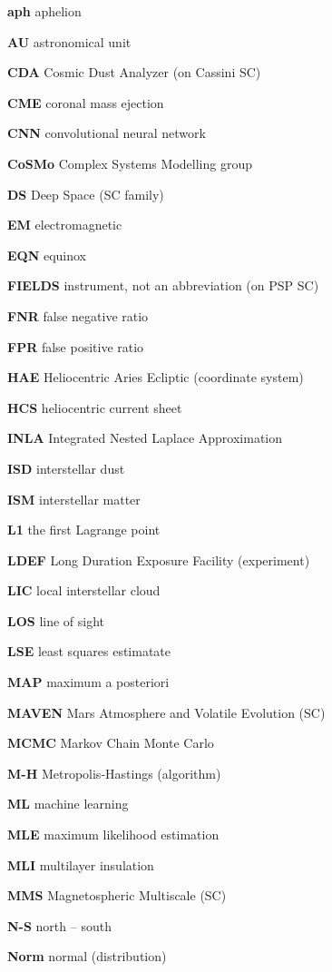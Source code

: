\noindent

\textbf{aph} aphelion

\textbf{AU} astronomical unit

\textbf{CDA} Cosmic Dust Analyzer (on Cassini SC)

\textbf{CME} coronal mass ejection

\textbf{CNN} convolutional neural network

\textbf{CoSMo} Complex Systems Modelling group

\textbf{DS} Deep Space (SC family)

\textbf{EM} electromagnetic

\textbf{EQN} equinox

\textbf{FIELDS} instrument, not an abbreviation (on PSP SC)

\textbf{FNR} false negative ratio

\textbf{FPR} false positive ratio

\textbf{HAE} Heliocentric Aries Ecliptic (coordinate system)

\textbf{HCS} heliocentric current sheet

\textbf{INLA} Integrated Nested Laplace Approximation

\textbf{ISD} interstellar dust

\textbf{ISM} interstellar matter

\textbf{L1} the first Lagrange point

\textbf{LDEF} Long Duration Exposure Facility (experiment)

\textbf{LIC} local interstellar cloud

\textbf{LOS} line of sight

\textbf{LSE} least squares estimatate

\textbf{MAP} maximum a posteriori

\textbf{MAVEN}  Mars Atmosphere and Volatile Evolution (SC)

\textbf{MCMC} Markov Chain Monte Carlo

\textbf{M-H} Metropolis-Hastings (algorithm)

\textbf{ML} machine learning

\textbf{MLE} maximum likelihood estimation

\textbf{MLI} multilayer insulation

\textbf{MMS} Magnetospheric Multiscale (SC)

\textbf{N-S} north -- south

\textbf{Norm} normal (distribution) 

